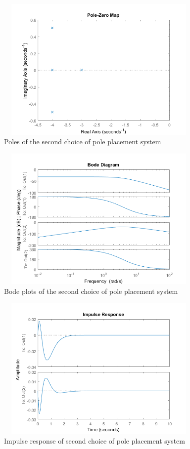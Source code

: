 \documentclass [12pt,letterpaper]{exam}
\begin{document}
\begin{figure}[H]
  \centering
    \includegraphics[width=10.15cm, height=7cm]{pl2_poles} 
  \caption{Poles of the second choice of pole placement system}
  \label{fig:pl2_poles}
\end{figure}

\begin{figure}[H]
  \centering
    \includegraphics[width=10.15cm, height=7cm]{pl2_bode} 
  \caption{Bode plots of the second choice of pole placement system}
  \label{fig:pl2_bode}
\end{figure}

\begin{figure}[H]
  \centering
    \includegraphics[width=10.15cm, height=7cm]{pl2_impulse} 
  \caption{Impulse response of second choice of pole placement system}
  \label{fig:pl2_impulse}
\end{figure}
\end{document}
